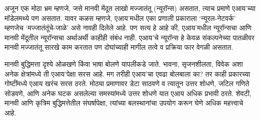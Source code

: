 अजून एक मोठा भ्रम म्हणजे, जसे मानवी मेंदूत लाखो मज्जातंतू (न्यूरॉन्स) असतात, त्याच प्रमाणे एआय'च्या मॉडेलमथ्ये पण असतात. यावर कळस म्हणजे, एआय'मधील एका प्रणाली प्रकाराला `न्यूरल-नेटवर्क' म्हणजेच `मज्जातंतूंचे-जाळे' असे नावही दिलेले आहे. पण सत्य हे आहे की,  एआय'मधील न्यूरॉन्सचा आणि मानवी मेंदूतील न्यूरॉन्सचा अर्थाअर्थी काहीही संबंध नाही. एआय'चे न्यूरॉन्स हे केवळ संकल्पनेच्या पातळीवर मानवी मज्जातंतू सारखे काम करतात पण दोघांच्याही मागील तत्वे व प्रक्रिया फार वेगळी असतात. 

मानवी बुद्धिमत्ता दृश्ये ओळखणे किंवा भाषा बोलणे यापलीकडे जाते. भावना, सृजनशीलता, विवेक अशा अनेक क्षेत्रांमध्ये ती एआय'पेक्षा सरस आहे. मग तरीही एआय'चा एवढा बोलबाला का? तर काही प्रकारच्या गोष्टींमध्ये एआय खरंच सरस ठरते. मोठ्या प्रमाणावर डेटा साठवणे व त्यातून उत्तर शोधणे, जटिल गणिते सोडवणे, आणि अनेक घटक असलेल्या समस्यांमध्ये उत्तर शोधणे यात एआय अधिक प्रभावी ठरते. शेवटी, मानवी आणि कृत्रिम बुद्धिमत्तेतील संघर्षापेक्षा, त्यांच्या बलस्थानांचा उपयोग करून घेणे अधिक महत्त्वाचे आहे.



